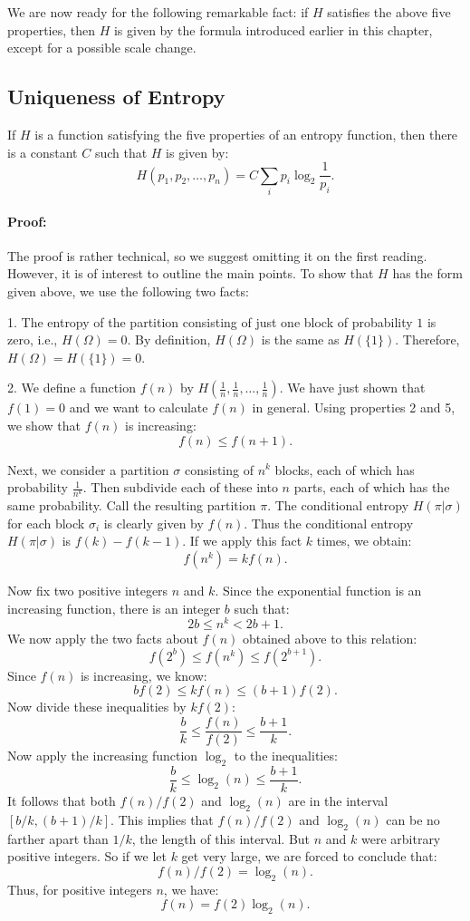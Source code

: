 \documentclass{report}
\begin{document}
We are now ready for the following remarkable fact: if \( H \) satisfies the above five properties, then \( H \) is given by the formula introduced earlier in this chapter, except for a possible scale change.

\subsection*{Uniqueness of Entropy}
If \( H \) is a function satisfying the five properties of an entropy function, then there is a constant \( C \) such that \( H \) is given by:
\[
H(p_1, p_2, \ldots, p_n) = C \sum_{i} p_i \log_2 \frac{1}{p_i}.
\]

\paragraph{Proof:} 
The proof is rather technical, so we suggest omitting it on the first reading. However, it is of interest to outline the main points. To show that \( H \) has the form given above, we use the following two facts:

1. The entropy of the partition consisting of just one block of probability \( 1 \) is zero, i.e., \( H(\Omega) = 0 \). By definition, \( H(\Omega) \) is the same as \( H(\{1\}) \). Therefore, \( H(\Omega) = H(\{1\}) = 0 \).

2. We define a function \( f(n) \) by \( H\left(\frac{1}{n}, \frac{1}{n}, \ldots, \frac{1}{n}\right) \). We have just shown that \( f(1) = 0 \) and we want to calculate \( f(n) \) in general. Using properties 2 and 5, we show that \( f(n) \) is increasing:
\[
f(n) \leq f(n+1).
\]

Next, we consider a partition \( \sigma \) consisting of \( n^k \) blocks, each of which has probability \( \frac{1}{n^k} \). Then subdivide each of these into \( n \) parts, each of which has the same probability. Call the resulting partition \( \pi \). The conditional entropy \( H(\pi|\sigma) \) for each block \( \sigma_i \) is clearly given by \( f(n) \). Thus the conditional entropy \( H(\pi|\sigma) \) is \( f(k) - f(k-1) \). If we apply this fact \( k \) times, we obtain:
\[
f(n^k) = k f(n).
\]

Now fix two positive integers \( n \) and \( k \). Since the exponential function is an increasing function, there is an integer \( b \) such that:
\[
2b \leq n^k < 2b+1.
\]
We now apply the two facts about \( f(n) \) obtained above to this relation:
\[
f(2^b) \leq f(n^k) \leq f(2^{b+1}).
\]
Since \( f(n) \) is increasing, we know:
\[
b f(2) \leq k f(n) \leq (b+1)f(2).
\]
Now divide these inequalities by \( k f(2) \):
\[
\frac{b}{k} \leq \frac{f(n)}{f(2)} \leq \frac{b+1}{k}.
\]
Now apply the increasing function \( \log_2 \) to the inequalities:
\[
\frac{b}{k} \leq \log_2(n) \leq \frac{b+1}{k}.
\]
It follows that both \( f(n)/f(2) \) and \( \log_2(n) \) are in the interval \( [b/k, (b+1)/k] \). This implies that \( f(n)/f(2) \) and \( \log_2(n) \) can be no farther apart than \( 1/k \), the length of this interval. But \( n \) and \( k \) were arbitrary positive integers. So if we let \( k \) get very large, we are forced to conclude that:
\[
f(n)/f(2) = \log_2(n).
\]
Thus, for positive integers \( n \), we have:
\[
f(n) = f(2) \log_2(n).
\]
\end{document}

